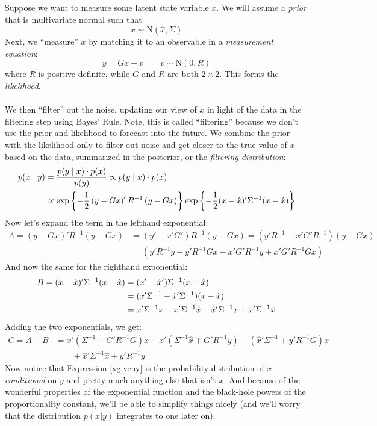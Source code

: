 \documentclass[a4paper,12pt]{article}
\begin{document}
Suppose we want to measure some latent state variable $x$. We will 
assume a \emph{prior} that is multivariate normal such that
    \[ x \sim \text{N}(\hat{x}, \Sigma) \]
Next, we ``measure'' $x$ by matching it to an observable in
a \emph{measurement equation}:
    \[ y = G x + v \qquad v\sim \text{N}(0, R) \]
where $R$ is positive definite, while $G$ and $R$ are both 
$2 \times 2$. This forms the \emph{likelihood}.
\\
\\
We then ``filter'' out the noise, updating our view of $x$ in
light of the data in the filtering step using Bayes' Rule.
Note, this is called ``filtering'' because we don't use the prior
and likelihood to forecast into
the future. We combine the prior with the likelihood only to filter
out noise and get closer to the true value of $x$ based on
the data, summarized in the posterior, or the
\emph{filtering distribution}:
\begin{align}
    p(x \; | \; y) &= \frac{p(y \; | \; x) \cdot p(x)}{p(y)} 
    \propto p(y \; | \; x) \cdot p(x) \label{xgiveny} \\
    &\propto \exp\left\{-\frac{1}{2}
	\left( y - Gx \right)' R^{-1} \left(y-Gx\right)
	\right\} \exp\left\{-\frac{1}{2}( x - \hat{x} )' 
	\Sigma^{-1} (x-\hat{x})\right\} \notag
\end{align}
Now let's expand the term in the lefthand exponential:
\begin{align*}
    A = \left( y - Gx \right)' R^{-1} \left(y-Gx\right) &= 
	\left( y' - x'G' \right) R^{-1} \left(y-Gx\right) 
    = \left( y'R^{-1} - x'G'R^{-1} \right)  \left(y-Gx\right) \\
    &= \left( y'R^{-1}y - y'R^{-1} Gx - x'G'R^{-1} y 
	+ x'G'R^{-1} Gx\right)
\end{align*}
And now the same for the righthand exponential:
\begin{align}
     B = ( x - \hat{x} )' \Sigma^{-1} (x-\hat{x}) 
	&= ( x' - \hat{x}' ) \Sigma^{-1} (x-\hat{x}) \notag\\
    &=  (x'\Sigma^{-1} - \hat{x}'\Sigma^{-1})   
	(x-\hat{x}) \notag \\
    &=  x'\Sigma^{-1} x - x'\Sigma^{-1} \hat{x} - 
	\hat{x}'\Sigma^{-1} x
	+ \hat{x}'\Sigma^{-1} \hat{x} \label{B}
\end{align}
Adding the two exponentials, we get:
\begin{align*}
    C = A + B &= x' \left( \Sigma^{-1} + G'R^{-1}G\right) x 
	- x' (\Sigma^{-1} \hat{x} + G'R^{-1}y)
	- (\hat{x}' \Sigma^{-1} + y' R^{-1}G) x  \\
	& \qquad + \hat{x}' \Sigma^{-1} \hat{x} + y' R^{-1} y 
\end{align*}
Now notice that Expression \ref{xgiveny} is the probability
distribution of $x$ \emph{conditional} on $y$ and pretty
much anything else that isn't $x$.  And because of the
wonderful properties of the exponential function and the
black-hole powers of the proportionality constant, we'll be
able to simplify things nicely (and we'll worry that the
distribution $p(x|y)$ integrates to one later on).  
\end{document}
